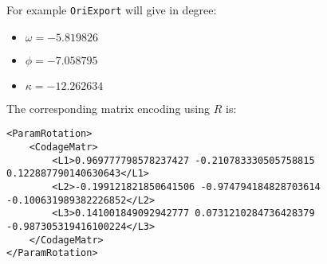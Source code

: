 For example {\tt OriExport} will give in degree:
\newline


\begin{itemize}
\item $\omega=-5.819826$  
\item $\phi=-7.058795$  
\item $\kappa=-12.262634$\newline
\end{itemize}



The corresponding matrix encoding using $R$ is:


\begin{verbatim}
<ParamRotation>
    <CodageMatr>
        <L1>0.969777798578237427 -0.210783330505758815 0.122887790140630643</L1>
        <L2>-0.199121821850641506 -0.974794184828703614 -0.100631989382226852</L2>
        <L3>0.141001849092942777 0.0731210284736428379 -0.987305319416100224</L3>
	</CodageMatr>
</ParamRotation>
\end{verbatim}

